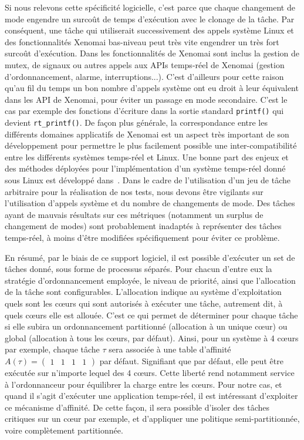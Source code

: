 \documentclass[french, a4paper, 11pt, twoside, pdftex]{StyleThese}
\begin{document}
		Si nous relevons cette spécificité logicielle, c'est parce que chaque changement de mode engendre un surcoût de temps d'exécution avec le clonage de la tâche. Par conséquent, une tâche qui utiliserait successivement des appels système Linux et des fonctionnalités Xenomai bas-niveau peut très vite engendrer un très fort surcoût d'exécution. Dans les fonctionnalités de Xenomai sont inclus la gestion de mutex, de signaux ou autres appels aux APIs temps-réel de Xenomai (gestion d'ordonnancement, alarme, interruptions...). C'est d'ailleurs pour cette raison qu'au fil du temps un bon nombre d'appels système ont eu droit à leur équivalent dans les API de Xenomai, pour éviter un passage en mode secondaire. C'est le cas par exemple des fonctions d'écriture dans la sortie standard \texttt{printf()} qui devient \texttt{rt\_printf()}. De façon plus générale, la correspondance entre les différents domaines applicatifs de Xenomai est un aspect très important de son développement pour permettre le plus facilement possible une inter-compatibilité entre les différents systèmes temps-réel et Linux. Une bonne part des enjeux et des méthodes déployées pour l'implémentation d'un système temps-réel donné sous Linux est développé dans~\cite{gerum_xenomai_2015}. 
	    Dans le cadre de l'utilisation d'un jeu de tâche arbitraire pour la réalisation de nos tests, nous devons être vigilants sur l'utilisation d'appels système et du nombre de changements de mode. Des tâches ayant de mauvais résultats sur ces métriques (notamment un surplus de changement de modes) sont probablement inadaptés à représenter des tâches temps-réel, à moins d'être modifiées spécifiquement pour éviter ce problème. 


        En résumé, par le biais de ce support logiciel, il est possible d'exécuter un set de tâches donné, sous forme de processus séparés. Pour chacun d'entre eux la stratégie d'ordonnancement employée, le niveau de priorité, ainsi que l'allocation de la tâche sont configurables. L'allocation indique au système d'exploitation quels sont les cœurs qui sont autorisés à exécuter une tâche, autrement dit, à quels cœurs elle est allouée. C'est ce qui permet de déterminer pour chaque tâche si elle subira un ordonnancement partitionné (allocation à un unique cœur) ou global (allocation à tous les cœurs, par défaut).  Ainsi, pour un système à 4 cœurs par exemple, chaque tâche $\tau$ sera associée à une table d'affinité $A(\tau) = \begin{pmatrix}1 & 1 & 1 & 1\end{pmatrix}$ par défaut. Signifiant que par défaut, elle peut être exécutée sur n'importe lequel des 4 cœurs. Cette liberté rend notamment service à l'ordonnanceur pour équilibrer la charge entre les cœurs. Pour notre cas, et quand il s'agit d'exécuter une application temps-réel, il est intéressant d'exploiter ce mécanisme d'affinité. De cette façon, il sera possible d'isoler des tâches critiques sur un cœur par exemple, et d'appliquer une politique semi-partitionnée, voire complètement partitionnée.
        
\end{document}
